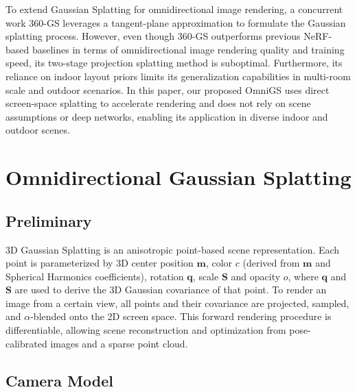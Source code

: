 \documentclass[10pt,twocolumn,letterpaper]{article}
\begin{document}
To extend Gaussian Splatting for omnidirectional image rendering, a concurrent work 360-GS \cite{3dgs:360gs} leverages a tangent-plane approximation to formulate the Gaussian splatting process. However, even though 360-GS outperforms previous NeRF-based baselines in terms of omnidirectional image rendering quality and training speed, its two-stage projection splatting method is suboptimal. Furthermore, its reliance on indoor layout priors limits its generalization capabilities in multi-room scale and outdoor scenarios.
In this paper, our proposed OmniGS uses direct screen-space splatting to accelerate rendering and does not rely on scene assumptions or deep networks, enabling its application in diverse indoor and outdoor scenes. 

\section{Omnidirectional Gaussian Splatting}


\subsection{Preliminary}\label{subsec:splatting-preliminary}
3D Gaussian Splatting\cite{3dgs} is an anisotropic point-based scene representation. Each point is parameterized by 3D center position $\mathbf{m}$, color $c$ (derived from $\mathbf{m}$ and Spherical Harmonics coefficients), rotation $\mathbf{q}$, scale $\mathbf{S}$ and opacity $o$, where $\mathbf{q}$ and $\mathbf{S}$ are used to derive the 3D Gaussian covariance of that point. To render an image from a certain view, all points and their covariance are projected, sampled, and $\alpha$-blended onto the 2D screen space. This forward rendering procedure is differentiable, allowing scene reconstruction and optimization from pose-calibrated images and a sparse point cloud.

\subsection{Camera Model}\label{subsec:splatting-camera-model}
\end{document}
